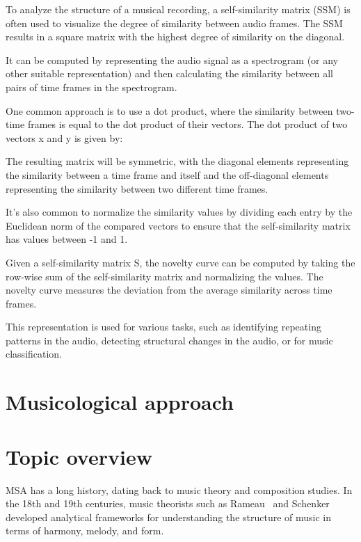 To analyze the structure of a musical recording, a self-similarity matrix (SSM) is often used to visualize the degree of similarity between audio frames. The SSM results in a square matrix with the highest degree of similarity on the diagonal.

It can be computed by representing the audio signal as a spectrogram (or any other suitable representation) and then calculating the similarity between all pairs of time frames in the spectrogram.

One common approach is to use a dot product, where the similarity between two-time frames is equal to the dot product of their vectors. The dot product of two vectors x and y is given by:



The resulting matrix will be symmetric, with the diagonal elements representing the similarity between a time frame and itself and the off-diagonal elements representing the similarity between two different time frames.

It's also common to normalize the similarity values by dividing each entry by the Euclidean norm of the compared vectors to ensure that the self-similarity matrix has values between -1 and 1.

Given a self-similarity matrix S, the novelty curve can be computed by taking the row-wise sum of the self-similarity matrix and normalizing the values. The novelty curve measures the deviation from the average similarity across time frames.



This representation is used for various tasks, such as identifying repeating patterns in the audio, detecting structural changes in the audio, or for music classification.

\section{Musicological approach}
\section{Topic overview}

MSA has a long history, dating back to music theory and composition studies. In the 18th and 19th centuries, music theorists such as Rameau~\cite{christensen2004rameau} and Schenker~\cite{schenkerdocumentsonline} developed analytical frameworks for understanding the structure of music in terms of harmony, melody, and form.

